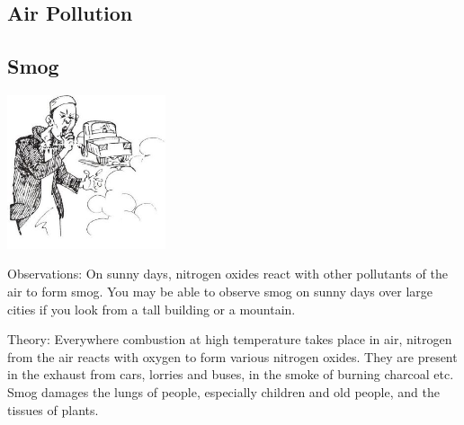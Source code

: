 \begin{multicols}{2}
\columnbreak


\section*{Air Pollution} %


\subsection{Smog}

\begin{center}
\includegraphics[width=0.35\textwidth]{./img/source/pollution-smog.jpg}
\end{center}

\begin{description*}
\item[Observations:]{On sunny days, nitrogen oxides react with other
pollutants of the air to form smog. You may be
able to observe smog on sunny days over large
cities if you look from a tall building or a
mountain.}
\item[Theory:]{Everywhere combustion at high temperature
takes place in air, nitrogen from the air reacts
with oxygen to form various nitrogen oxides.
They are present in the exhaust from cars,
lorries and buses, in the smoke of burning
charcoal etc. Smog damages the lungs of people,
especially children and old people, and the
tissues of plants.}
\end{description*}


\end{multicols}
